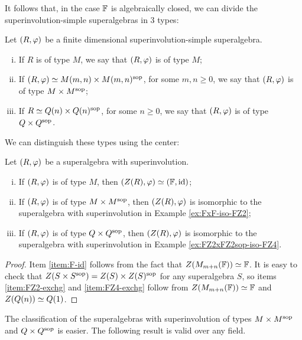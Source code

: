 It follows that, in the case $\mathbb{F}$ is algebraically closed, we can divide the superinvolution-simple superalgebras in 3 types:

\begin{defi}
    Let $(R, \varphi)$ be a finite dimensional superinvolution-simple superalgebra. 
    \begin{enumerate}[(i)]
        \item If $R$ is of type $M$, we say that $(R, \varphi)$ is of type $M$;
        \item If $(R, \varphi) \simeq M(m,n) \times M(m,n)^{\mathrm{sop}}$, for some $m,n \geq 0$, we say that $(R, \varphi)$ is of type $M\times M^{\mathrm{sop}}$;
        \item If $R \simeq Q(n) \times Q(n)^{\mathrm{sop}}$, for some $n \geq 0$, we say that $(R, \varphi)$ is of type $Q \times Q^{\mathrm{sop}}$.
    \end{enumerate}
\end{defi}

We can distinguish these types using the center:

\begin{prop}\label{prop:types-of-SA-via-center}
	Let $(R, \varphi)$ be a superalgebra with superinvolution.
	\begin{enumerate}[(i)]
		\item If $(R, \varphi)$ is of type $M$, then $(Z(R), \varphi) \simeq (\mathbb{F}, \operatorname{id})$;\label{item:F-id}
		\item If $(R, \varphi)$ is of type $M\times M^{\mathrm{sop}}$, then $(Z(R), \varphi)$ is isomorphic to the superalgebra with superinvolution in Example \ref{ex:FxF-iso-FZ2};\label{item:FZ2-exchg}
		\item If $(R, \varphi)$ is of type $Q\times Q^{\mathrm{sop}}$, then $(Z(R), \varphi)$ is isomorphic to the superalgebra with superinvolution in Example \ref{ex:FZ2xFZ2sop-iso-FZ4}.\label{item:FZ4-exchg}
	\end{enumerate}
\end{prop}

\begin{proof}
	Item \eqref{item:F-id} follows from the fact that $Z(M_{m+n}(\mathbb{F})) \simeq \mathbb{F}$.
	It is easy to check that $Z(S\times S^{\mathrm{sop}}) = Z(S) \times Z(S)^{\mathrm{sop}}$ for any superalgebra $S$, so items \eqref{item:FZ2-exchg} and \eqref{item:FZ4-exchg} follow from $Z(M_{m+n}(\mathbb{F})) \simeq \mathbb{F}$ and $Z(Q(n)) \simeq Q(1)$.
\end{proof}

The classification of the superalgebras with superinvolution of types $M\times M^{\mathrm{sop}}$ and $Q\times Q^{\mathrm{sop}}$ is easier. 
The following result is valid over any field.

